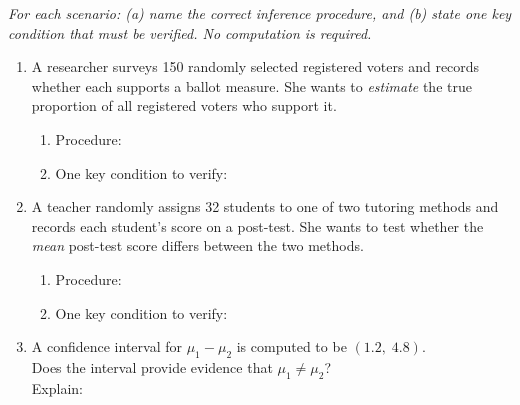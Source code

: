 \documentclass[10pt]{article}
\begin{document}
\namedateperiod

\vspace{0.15in}

\textit{For each scenario: (a) name the correct inference procedure, and (b) state one key
condition that must be verified. No computation is required.}

\vspace{0.10in}
\begin{enumerate}

\item A researcher surveys 150 randomly selected registered voters and records whether each
      supports a ballot measure. She wants to \emph{estimate} the true proportion of all
      registered voters who support it.

      \begin{enumerate}[label=\alph*.]
        \item Procedure: \blank{9cm}
        \item One key condition to verify: \writeline
      \end{enumerate}

\vspace{0.12in}

\item A teacher randomly assigns 32 students to one of two tutoring methods and records each
      student's score on a post-test. She wants to test whether the \emph{mean} post-test score
      differs between the two methods.

      \begin{enumerate}[label=\alph*.]
        \item Procedure: \blank{9cm}
        \item One key condition to verify: \writeline
      \end{enumerate}

\vspace{0.12in}

\item A confidence interval for $\mu_1 - \mu_2$ is computed to be $(1.2,\; 4.8)$.\\
      Does the interval provide evidence that $\mu_1 \ne \mu_2$? \blank{2cm}\\
      Explain: \writeline

\end{enumerate}
\end{document}
